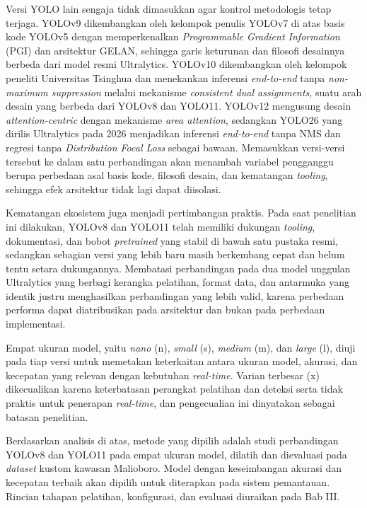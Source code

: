 Versi YOLO lain sengaja tidak dimasukkan agar kontrol metodologis tetap terjaga. YOLOv9 
\cite{wang2024yolov9} dikembangkan oleh kelompok penulis YOLOv7 di atas basis kode YOLOv5 
dengan memperkenalkan \textit{Programmable Gradient Information} (PGI) dan arsitektur GELAN, 
sehingga garis keturunan dan filosofi desainnya berbeda dari model resmi Ultralytics. 
YOLOv10 \cite{wang2024yolov10} dikembangkan oleh kelompok peneliti Universitas Tsinghua dan 
menekankan inferensi \textit{end-to-end} tanpa \textit{non-maximum suppression} melalui 
mekanisme \textit{consistent dual assignments}, suatu arah desain yang berbeda dari YOLOv8 
dan YOLO11. YOLOv12 \cite{tian2025yolov12} mengusung desain \textit{attention-centric} 
dengan mekanisme \textit{area attention}, sedangkan YOLO26 \cite{jocher2026yolo26} yang 
dirilis Ultralytics pada 2026 menjadikan inferensi \textit{end-to-end} tanpa NMS dan regresi 
tanpa \textit{Distribution Focal Loss} sebagai bawaan. Memasukkan versi-versi tersebut ke 
dalam satu perbandingan akan menambah variabel pengganggu berupa perbedaan asal basis kode, 
filosofi desain, dan kematangan \textit{tooling}, sehingga efek arsitektur tidak lagi dapat 
diisolasi.

Kematangan ekosistem juga menjadi pertimbangan praktis. Pada saat penelitian ini dilakukan, 
YOLOv8 dan YOLO11 telah memiliki dukungan \textit{tooling}, dokumentasi, dan bobot 
\textit{pretrained} yang stabil di bawah satu pustaka resmi, sedangkan sebagian versi yang 
lebih baru masih berkembang cepat dan belum tentu setara dukungannya. Membatasi perbandingan 
pada dua model unggulan Ultralytics yang berbagi kerangka pelatihan, format data, dan 
antarmuka yang identik justru menghasilkan perbandingan yang lebih valid, karena perbedaan 
performa dapat diatribusikan pada arsitektur dan bukan pada perbedaan implementasi.

Empat ukuran model, yaitu \textit{nano} (n), \textit{small} (s), \textit{medium} (m), dan 
\textit{large} (l), diuji pada tiap versi untuk memetakan keterkaitan antara ukuran model, 
akurasi, dan kecepatan yang relevan dengan kebutuhan \textit{real-time}. Varian terbesar 
(x) dikecualikan karena keterbatasan perangkat pelatihan dan deteksi serta tidak praktis 
untuk penerapan \textit{real-time}, dan pengecualian ini dinyatakan sebagai batasan 
penelitian.

Berdasarkan analisis di atas, metode yang dipilih adalah studi perbandingan YOLOv8 dan 
YOLO11 pada empat ukuran model, dilatih dan dievaluasi pada \textit{dataset} kustom 
kawasan Malioboro. Model dengan keseimbangan akurasi dan kecepatan terbaik akan dipilih 
untuk diterapkan pada sistem pemantauan. Rincian tahapan pelatihan, konfigurasi, dan 
evaluasi diuraikan pada Bab III.
